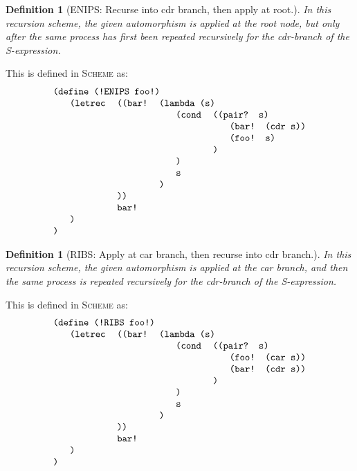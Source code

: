 \documentclass[11pt]{article} %
\newcommand{\eeq}{\end{equation}}
\newcommand{\beql}[1]{\begin{equation}\label{#1}}
\newcommand{\autletter}[1]{$#1$}
\newcommand{\automorphismlet}[1]{automorphism~\autletter{#1}}
\newcommand{\proglangname}[1]{{\textsc{#1}}}
\newcommand{\scmcode}[1]{{\tt{#1}}}
\newtheorem{definition}[theorem]{Definition}
\newenvironment{scmdefinefun7}{\begin{tabular}{l l l l l l l}}{\end{tabular}}
\begin{document}
\begin{definition}[{ENIPS: Recurse into cdr branch, then apply at root.}]
\normalfont
In this recursion scheme, the given automorphism %
is applied at the root node, but only {\em after} the same process
has first been repeated recursively for the cdr-branch
of the S-expression.
\end{definition}

This is defined in \proglangname{Scheme} as:
\beql{definerecscheme3} 
\begin{scmdefinefun7}
\multicolumn{7}{l}{\scmcode{(define (!ENIPS foo!)}}\\
 & \scmcode{(letrec} & \scmcode{((bar!} & \multicolumn{4}{l}{\scmcode{(lambda (s)}}\\
 & & & & \scmcode{(cond} & \multicolumn{2}{l}{\scmcode{((pair? s)}}\\
 & & & & & & \scmcode{(bar! (cdr s))}\\
 & & & & & & \scmcode{(foo! s)}\\
 & & & & & \scmcode{)}\\ %
 & & & & \scmcode{)}\\ %
 & & & & \scmcode{s}\\
 & & & \scmcode{)}\\ %
 & & \scmcode{))}\\ %
 & & \scmcode{bar!}\\ 
 & \scmcode{)}\\  %
\scmcode{)}\\ %
\end{scmdefinefun7}
\eeq


\begin{definition}[{RIBS: Apply at car branch, then recurse into cdr branch.}]
\normalfont
In this recursion scheme, the given automorphism %
is applied at the car branch, and then the same process
is repeated recursively for the cdr-branch of the S-expression.
\end{definition}

This is defined in \proglangname{Scheme} as:
\beql{definerecschemeM} 
\begin{scmdefinefun7}
\multicolumn{7}{l}{\scmcode{(define (!RIBS foo!)}}\\
 & \scmcode{(letrec} & \scmcode{((bar!} & \multicolumn{4}{l}{\scmcode{(lambda (s)}}\\
 & & & & \scmcode{(cond} & \multicolumn{2}{l}{\scmcode{((pair? s)}}\\
 & & & & & & \scmcode{(foo! (car s))}\\
 & & & & & & \scmcode{(bar! (cdr s))}\\
 & & & & & \scmcode{)}\\ %
 & & & & \scmcode{)}\\ %
 & & & & \scmcode{s}\\
 & & & \scmcode{)}\\ %
 & & \scmcode{))}\\ %
 & & \scmcode{bar!}\\ 
 & \scmcode{)}\\  %
\scmcode{)}\\ %
\end{scmdefinefun7}
\eeq
\end{document}
